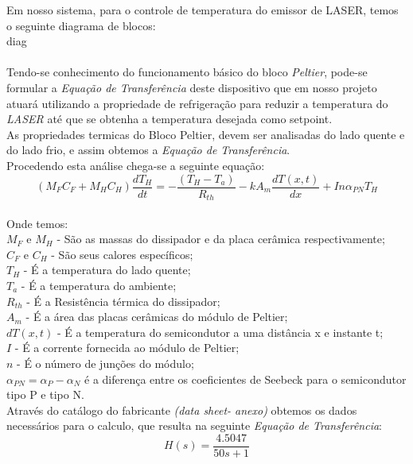 Em nosso sistema, para o controle de temperatura do emissor de LASER, temos o seguinte diagrama de blocos: \\

{diag}

\paragraph{}

Tendo-se conhecimento do funcionamento básico do bloco \emph{Peltier}, pode-se formular a \emph{Equação de Transferência} deste dispositivo que em nosso projeto atuará utilizando a propriedade de refrigeração para  reduzir a temperatura do \emph{LASER} até que se obtenha a temperatura desejada como setpoint.\\

As propriedades termicas do Bloco Peltier, devem ser analisadas do lado quente e do lado frio, e assim obtemos a \emph{Equação de Transferência}. \\

Procedendo esta análise chega-se a seguinte equação:\\

\[\left ( M_{F}C_{F} + M_{H}C_{H}\right )\frac{dT_{H}}{dt}= -\frac{\left ( T_{H}- T_{a} \right )}{R_{th}} - kA_{m} \frac{dT(x,t)}{dx} + I n \alpha_{PN} T_{H}\] \\
Onde temos:\\
$M_{F}$ e $M_{H} $ - São as massas do dissipador e da placa cerâmica respectivamente;\\
$ C_{F} $ e $ C_{H} $ - São seus calores específicos;\\
$ T_{H} $ - É a temperatura do lado quente;\\
$ T_{a} $ - É a temperatura do ambiente;\\
$ R_{th} $ - É a Resistência térmica do dissipador;\\
$A_{m} $ - É a área das placas cerâmicas do módulo de Peltier;\\
$ dT(x,t) $ - É a temperatura do semicondutor a uma distância x e instante t;\\
$ I $ - É a corrente fornecida ao módulo de Peltier;\\
$ n $ - É o número de junções do módulo;\\
$ \alpha_{PN} = \alpha_{P} - \alpha_{N}$ é a diferença entre os coeficientes de Seebeck para o semicondutor tipo P e tipo N. \\
Através do catálogo do fabricante \emph{(data sheet- anexo)} obtemos os dados necessários para o calculo, que resulta na seguinte \emph{Equação de Transferência}:\\
\[H(s)=\frac{4.5047}{50s+1}\]
